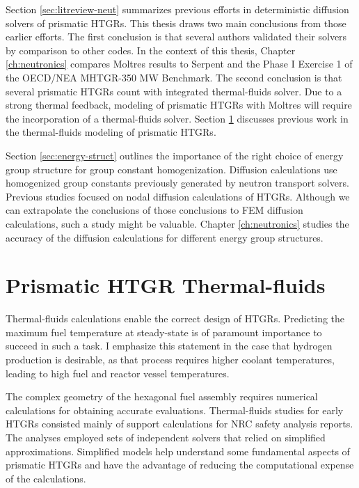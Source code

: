 Section \ref{sec:litreview-neut} summarizes previous efforts in deterministic diffusion solvers of prismatic HTGRs.
This thesis draws two main conclusions from those earlier efforts.
The first conclusion is that several authors validated their solvers by comparison to other codes.
In the context of this thesis, Chapter \ref{ch:neutronics} compares Moltres results to Serpent and the Phase I Exercise 1 of the OECD/NEA MHTGR-350 MW Benchmark.
The second conclusion is that several prismatic HTGRs count with integrated thermal-fluids solver.
Due to a strong thermal feedback, modeling of prismatic HTGRs with Moltres will require the incorporation of a thermal-fluids solver.
Section \ref{sec:litrev-thermalf} discusses previous work in the thermal-fluids modeling of prismatic HTGRs.

Section \ref{sec:energy-struct} outlines the importance of the right choice of energy group structure for group constant homogenization.
Diffusion calculations use homogenized group constants previously generated by neutron transport solvers.
Previous studies focused on nodal diffusion calculations of HTGRs.
Although we can extrapolate the conclusions of those conclusions to \gls{FEM} diffusion calculations, such a study might be valuable.
Chapter \ref{ch:neutronics} studies the accuracy of the diffusion calculations for different energy group structures.

\section{Prismatic HTGR Thermal-fluids}
\label{sec:litrev-thermalf}

Thermal-fluids calculations enable the correct design of \glspl{HTGR}.
Predicting the maximum fuel temperature at steady-state is of paramount importance to succeed in such a task.
I emphasize this statement in the case that hydrogen production is desirable, as that process requires higher coolant temperatures, leading to high fuel and reactor vessel temperatures.

The complex geometry of the hexagonal fuel assembly requires numerical calculations for obtaining accurate evaluations.
Thermal-fluids studies for early \glspl{HTGR} consisted mainly of support calculations for \gls{NRC} safety analysis reports.
The analyses employed sets of independent solvers that relied on simplified approximations.
Simplified models help understand some fundamental aspects of prismatic HTGRs and have the advantage of reducing the computational expense of the calculations.

